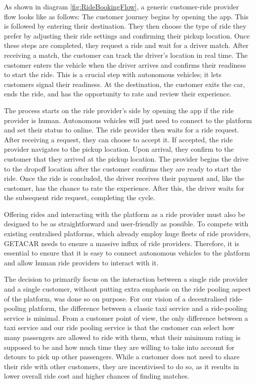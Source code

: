 As shown in diagram \ref{fig:RideBookingFlow}, a generic customer-ride provider flow looks like as follows:
The customer journey begins by opening the app. This is followed by entering their destination. They then choose the type of ride they prefer by adjusting their ride settings and confirming their pickup location. Once these steps are completed, they request a ride and wait for a driver match. After receiving a match, the customer can track the driver's location in real time. The customer enters the vehicle when the driver arrives and confirms their readiness to start the ride. This is a crucial step with autonomous vehicles; it lets customers signal their readiness. At the destination, the customer exits the car, ends the ride, and has the opportunity to rate and review their experience.

The process starts on the ride provider's side by opening the app if the ride provider is human. Autonomous vehicles will just need to connect to the platform and set their status to online. The ride provider then waits for a ride request. After receiving a request, they can choose to accept it. If accepted, the ride provider navigates to the pickup location. Upon arrival, they confirm to  the customer that they arrived at the pickup location. The provider begins the drive to the dropoff location after the customer confirms they are ready to start the ride. Once the ride is concluded, the driver receives their payment and, like the customer, has the chance to rate the experience. After this, the driver waits for the subsequent ride request, completing the cycle.

Offering rides and interacting with the platform as a ride provider must also be designed to be as straightforward and user-friendly as possible. To compete with existing centralised platforms, which already employ huge fleets of ride providers, GETACAR needs to ensure a massive influx of ride providers. Therefore, it is essential to ensure that it is easy to connect autonomous vehicles to the platform and allow human ride providers to interact with it. 

The decision to primarily focus on the interaction between a single ride provider and a single customer, without putting extra emphasis on the ride pooling aspect of the platform, was done so on purpose. For our vision of a decentralised ride-pooling platform, the difference between a classic taxi service and a ride-pooling service is minimal. From a customer point of view, the only difference between a taxi service and our ride pooling service is that the customer can select how many passengers are allowed to ride with them, what their minimum rating is supposed to be and how much time they are willing to take into account for detours to pick up other passengers. While a customer does not need to share their ride with other customers, they are incentivised to do so, as it results in lower overall ride cost and higher chances of finding matches. 


